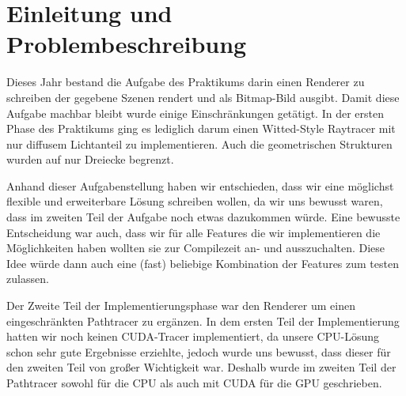 \section{Einleitung und Problembeschreibung}


Dieses Jahr bestand die Aufgabe des Praktikums darin einen Renderer zu schreiben der gegebene Szenen rendert und als Bitmap-Bild ausgibt.
Damit diese Aufgabe machbar bleibt wurde einige Einschränkungen getätigt.
In der ersten Phase des Praktikums ging es lediglich darum einen Witted-Style Raytracer mit nur diffusem Lichtanteil zu implementieren.
Auch die geometrischen Strukturen wurden auf nur Dreiecke begrenzt.

Anhand dieser Aufgabenstellung haben wir entschieden, dass wir eine möglichst flexible und erweiterbare Lösung schreiben wollen, da wir uns bewusst waren, dass im zweiten Teil der Aufgabe noch etwas dazukommen würde.
Eine bewusste Entscheidung war auch, dass wir für alle Features die wir implementieren die Möglichkeiten haben wollten sie zur Compilezeit an- und ausszuchalten. Diese Idee würde dann auch eine (fast) beliebige Kombination der Features zum testen zulassen.

Der Zweite Teil der Implementierungsphase war den Renderer um einen eingeschränkten Pathtracer zu ergänzen.
In dem ersten Teil der Implementierung hatten wir noch keinen CUDA-Tracer implementiert, da unsere CPU-Lösung schon sehr gute Ergebnisse erziehlte, jedoch wurde uns bewusst, dass dieser für den zweiten Teil von großer Wichtigkeit war.
Deshalb wurde im zweiten Teil der Pathtracer sowohl für die CPU als auch mit CUDA für die GPU geschrieben.

